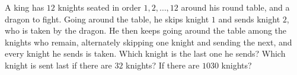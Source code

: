 A king has $12$ knights seated in order $1,2,\dots,12$ around his round table, and a dragon to fight. Going around the table, he skips knight $1$ and sends knight $2$, who is taken by the dragon. He then keeps going around the table among the knights who remain, alternately skipping one knight and sending the next, and every knight he sends is taken. Which knight is the last one he sends? Which knight is sent last if there are $32$ knights? If there are $1030$ knights?
